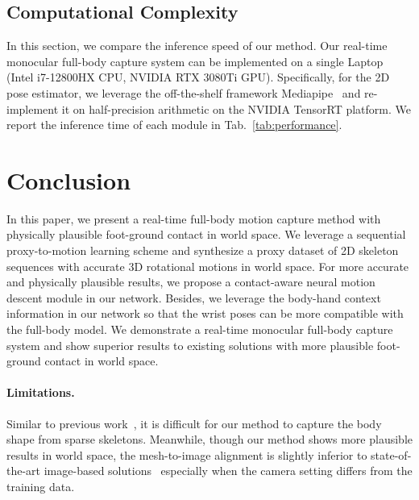 \documentclass[10pt,twocolumn,letterpaper]{article}
\begin{document}
\subsection{Computational Complexity}
In this section, we compare the inference speed of our method.
Our real-time monocular full-body capture system can be implemented on a single Laptop (Intel i7-12800HX CPU, NVIDIA RTX 3080Ti GPU).
Specifically, for the 2D pose estimator, we leverage the off-the-shelf framework Mediapipe~\cite{lugaresi2019mediapipe} and re-implement it on half-precision arithmetic on the NVIDIA TensorRT platform.
We report the inference time of each module in Tab.~\ref{tab:performance}. 

















 \section{Conclusion}
In this paper, we present a real-time full-body motion capture method with physically plausible foot-ground contact in world space.
We leverage a sequential proxy-to-motion learning scheme and synthesize a proxy dataset of 2D skeleton sequences with accurate 3D rotational motions in world space.
For more accurate and physically plausible results, we propose a contact-aware neural motion descent module in our network.
Besides, we leverage the body-hand context information in our network so that the wrist poses can be more compatible with the full-body model.
We demonstrate a real-time monocular full-body capture system and show superior results to existing solutions with more plausible foot-ground contact in world space.


\paragraph{Limitations.}

Similar to previous work~\cite{song2020human}, it is difficult for our method to capture the body shape from sparse skeletons.
Meanwhile, though our method shows more plausible results in world space, the mesh-to-image alignment is slightly inferior to state-of-the-art image-based solutions~\cite{zhang2021pymaf,pymafx2022} especially when the camera setting differs from the training data.

 
{\small


}
\end{document}
